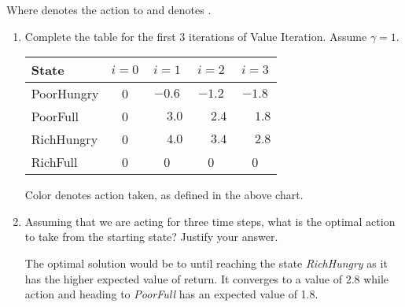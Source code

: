 \documentclass[12pt]{article}
\begin{document}
\begin{center}

Where {\color{red}{red}} denotes the action to {\color{red}{Eat}} and {\color{blue}{blue}} denotes {\color{blue}{Play}}.
\end{center}

\newpage
\begin{enumerate}

\item Complete the table for the first 3 iterations of Value
  Iteration. Assume $\gamma = 1$.

\begin{center}
\begin{tabular}{|l|c|c|c|c|} \hline
State      & $i=0$ & $i=1$ & $i=2$ & $i=3$ \\ \hline \hline
PoorHungry & 0     &$-0.6$&$-1.2$&$-1.8$\\ \hline
PoorFull   & 0     &$\phantom{-}3.0$&$\phantom{-}2.4$&$\phantom{-}1.8$\\ \hline
RichHungry & 0     &$\phantom{-}4.0$&$\phantom{-}3.4$&$\phantom{-}2.8$\\ \hline
RichFull   & 0     & 0     & 0     & 0     \\ \hline
\end{tabular}
\end{center}

Color denotes action taken, as defined in the above chart.

\item Assuming that we are acting for three time steps, what is the
  optimal action to take from the starting state? Justify your answer.

The optimal solution would be to {\color{blue}{Play}} until reaching the state {\em RichHungry} as it has the higher expected value of return. It converges to a value of 2.8 while {\color{red}{Eat}} action and heading to {\em PoorFull} has an expected value of 1.8.

\end{enumerate}
\end{document}
